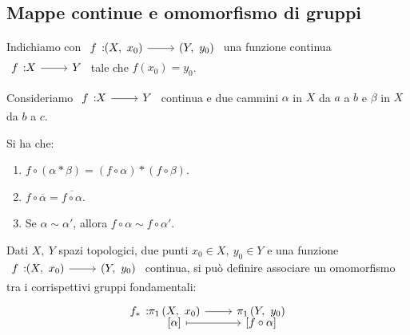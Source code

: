 \subsection{Mappe continue e omomorfismo di gruppi}
\begin{notate}
	Indichiamo con $\funz{f}{\left(X,\ x_0\right)}{\left(Y,\ y_0\right)}$ una funzione continua $\funz{f}{X}{Y}$ tale che $f\left(x_0\right)=y_0$.
\end{notate}
\begin{observe}
Consideriamo $\funz{f}{X}{Y}$ continua e due cammini $\alpha$ in $X$ da $a$ a $b$ e $\beta$ in $X$ da $b$ a $c$.
\begin{center}
\end{center}
Si ha che:
\begin{enumerate}
\item $f\circ \left(\alpha\ast\beta\right)=\left(f\circ\alpha\right)\ast\left(f\circ \beta\right)$.
\item $f\circ\overline{\alpha}=\overline{f\circ\alpha}$.
\item Se $\alpha\sim\alpha'$, allora $f\circ\alpha\sim f\circ\alpha'$.
\end{enumerate}
\end{observe}
\begin{proposition}
	Dati $X,\ Y$ spazi topologici, due punti $x_0\in X,\ y_0\in Y$ e una funzione $\funz{f}{\left(X,\ x_0\right)}{\left(Y,\ y_0\right)}$ continua, si può definire associare un omomorfismo tra i corrispettivi gruppi fondamentali:
	\begin{equation}
		\funztot{f_{\ast}}{\gruf{X}{x_0}}{\gruf{Y}{y_0}}{\left[\alpha\right]}{\left[f\circ\alpha\right]}
	\end{equation}
\vspace{-6mm}
\end{proposition}
